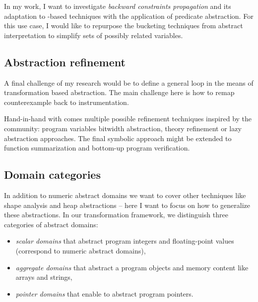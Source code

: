 In my work, I want to investigate \emph{backward constraints propagation} and
its adaptation to \cegar-based techniques with the application of predicate
abstraction. For this use case, I would like to repurpose the bucketing
techniques from abstract interpretation to simplify sets of possibly related
variables.


\subsection{Abstraction refinement}


A final challenge of my research would be to define a general \cegar loop in the
means of transformation based abstraction. The main challenge here is how to
remap counterexample back to instrumentation.

Hand-in-hand with \cegar comes multiple possible refinement techniques inspired
by the \smt community: program variables bitwidth abstraction, theory refinement
or lazy abstraction approaches. The final symbolic approach might be extended
to function summarization and bottom-up program verification.




\subsection{ Domain categories }

In addition to numeric abstract domains we want to cover other techniques like
shape analysis and heap abstractions -- here I want to focus on how to
generalize these abstractions. In our transformation framework, we distinguish
three categories of abstract domains:

\begin{itemize}
    \item \emph{scalar domains} that abstract program integers and floating-point values (correspond to numeric abstract domains),
    \item \emph{aggregate domains} that abstract a program objects and memory content like arrays and strings,

    \item \emph{pointer domains} that enable to abstract program pointers.
\end{itemize}

